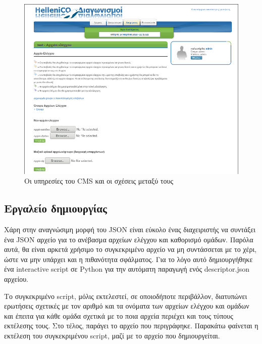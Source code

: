 \documentclass[diploma]{softlab-thesis}
\begin{document}


\begin{figure}
  \centering
  \includegraphics[scale=0.4,trim=4 4 4 4,clip]{Figures/massupload.png}
  \caption[Η αρχιτεκτονική του CMS]{Οι υπηρεσίες του CMS και οι σχέσεις μεταξύ τους}
\end{figure}

\subsection{Εργαλείο δημιουργίας}

Χάρη στην αναγνώσιμη μορφή του JSON είναι εύκολο ένας διαχειριστής να συντάξει
ένα JSON αρχείο για το ανέβασμα αρχείων ελέγχου και καθορισμό ομάδων. Παρόλα
αυτά, θα είναι αρκετά χρήσιμο το συγκεκριμένο αρχείο να μη συντάσσεται με το
χέρι, ώστε να μην υπάρχει και η πιθανότητα σφάλματος. Για το λόγο αυτό
δημιουργήθηκε ένα interactive script σε Python για την αυτόματη παραγωγή ενός
descriptor.json αρχείου.

\bigskip

Το συγκεκριμένο script, μόλις εκτελεστεί, σε οποιοδήποτε περιβάλλον, διατυπώνει
ερωτήσεις σχετικές με τον αριθμό και τα ονόματα των αρχείων ελέγχου και ομάδων
και έπειτα για κάθε ομάδα σχετικά με το ποια αρχεία περιέχει και τους τύπους
εκτέλεσης τους. Στο τέλος, παράγει το αρχείο που περιγράφηκε. Παρακάτω φαίνεται
η εκτέλεση του συγκεκριμένου script, μαζί με το αρχείο που δημιουργείται.
\end{document}

